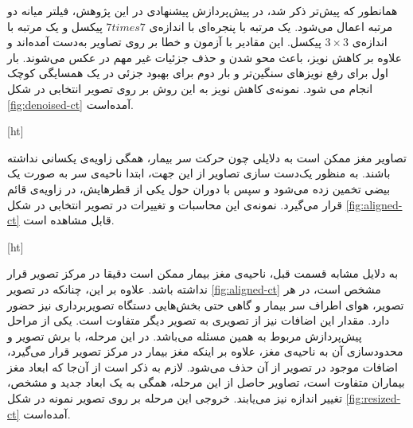 همانطور که پیش‌تر ذکر شد، در پیش‌پردازش پیشنهادی در این پژوهش، فیلتر میانه دو مرتبه اعمال می‌شود. 
یک مرتبه با پنجره‌ای با اندازه‌ی $7times7$ پیکسل و یک مرتبه با اندازه‌ی $3\times3$ پیکسل.
این مقادیر با آزمون و خطا بر روی تصاویر به‌دست آمده‌اند و علاوه بر کاهش نویز، باعث محو شدن و حذف جزئیات غیر مهم در عکس می‌شوند.
بار اول برای رفع نویز‌های سنگین‌تر و بار دوم برای بهبود جزئی در یک همسایگی کوچک انجام می شود.
نمونه‌ی کاهش نویز به این روش بر روی تصویر انتخابی 
در شکل
\ref{fig:denoised-ct}
آمده‌است.


[ht]
    
تصاویر مغز ممکن است به دلایلی چون حرکت سر بیمار، همگی زاویه‌ی یکسانی نداشته باشند.
به منظور یک‌دست سازی تصاویر از این جهت، ابتدا ناحیه‌ی سر به صورت یک بیضی تخمین زده می‌شود و سپس با دوران حول یکی از قطر‌هایش، در زاویه‌ی قائم قرار می‌گیرد.
نمونه‌ی این محاسبات و تغییرات در تصویر انتخابی در شکل \ref{fig:aligned-ct}
قابل مشاهده است.


[ht]

به دلایل مشابه قسمت قبل، ناحیه‌ی مغز بیمار ممکن است دقیقا در مرکز تصویر قرار نداشته باشد.
علاوه بر این، چنانکه در تصویر \ref{fig:aligned-ct} مشخص است، 
در هر تصویر، هوای اطراف سر بیمار و گاهی حتی بخش‌هایی دستگاه تصویربرداری نیز حضور دارد.
مقدار این اضافات نیز از تصویری به تصویر دیگر متفاوت است.
یکی از مراحل پیش‌پردازش مربوط به همین مسئله می‌باشد.
در این مرحله،
با برش تصویر و محدودسازی آن به ناحیه‌ی مغز،
علاوه بر اینکه مغز بیمار در مرکز تصویر قرار می‌گیرد، اضافات موجود در تصویر از آن حذف می‌شود.
لازم به ذکر است از آن‌جا که ابعاد مغز بیماران متفاوت است، تصاویر حاصل از این مرحله، همگی به یک ابعاد جدید و مشخص، تغییر اندازه نیز می‌یابند.
خروجی این مرحله بر روی تصویر نمونه در شکل 
\ref{fig:resized-ct}
آمده‌است.

